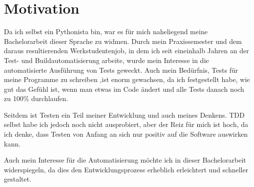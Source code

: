 \section{Motivation}
Da ich selbst ein \gls{Pythonista} bin, war es für mich naheliegend meine Bachelorarbeit
dieser Sprache zu widmen. Durch mein Praxissemester und dem daraus resultierenden
Werkstudentenjob, in dem ich seit eineinhalb Jahren an der Test- und Buildautomatisierung
arbeite, wurde mein Interesse in die automatisierte Ausführung von Tests geweckt. Auch mein
Bedürfnis, Tests für meine Programme zu schreiben ,ist enorm gewachsen, da ich festgestellt
habe, wie gut das Gefühl ist, wenn man etwas im Code ändert und alle Tests danach noch
zu 100\% durchlaufen.

Seitdem ist Testen ein Teil meiner Entwicklung und auch meines Denkens. TDD selbst habe
ich jedoch noch nicht ausprobiert, aber der Reiz für mich ist hoch, da ich denke, dass
Testen von Anfang an sich nur positiv auf die Software auswirken kann.

Auch mein Interesse für die Automatisierung möchte ich in dieser Bachelorarbeit 
widerspiegeln, da dies den Entwicklungsprozess erheblich erleichtert und schneller
gestaltet.
